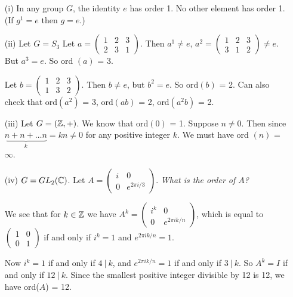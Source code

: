 \documentclass[10pt]{scrartcl}
\begin{document}
\begin{examples}\begin{enumerate}
 \item[(i)] In any group $G$, the identity $e$ has order 1. No other element has order 1. (If $g^1 = e$ then $g = e$.)
 
 \item[(ii)] Let $G = S_3$ Let $a  = \left(\begin{smallmatrix}
1 & 2 & 3 \\ 2 & 3 & 1	
\end{smallmatrix}\right)$. Then $a^1 \neq e$, $a^2 = \left(\begin{smallmatrix}
1 & 2 & 3 \\ 3 & 1 & 2 	
\end{smallmatrix}\right) \neq e$. But $a^3 = e$. So ord $(a)$ = 3.

 Let $b = \left(\begin{smallmatrix}
1 & 2 & 3 \\ 1 & 3 & 2	
\end{smallmatrix}\right).$ Then $b \neq e$, but $b^2 = e$. So ord$(b)$ = 2. Can also check that ord$(a^2)$ = 3, ord$(ab)$ = 2, ord$(a^2b)$ = 2.


\item[(iii)] Let $G = (\mathbb{Z},+)$. We know that ord$(0)$ = 1. Suppose $n \neq 0$. Then since $\underbrace{n + n + \dots n}_{k} = kn \neq 0$ for any positive integer $k$. We must have ord $(n)$ = $\infty$.
\item[(iv)] $G = GL_2(\mathbb{C})$. Let $A = \left(\begin{smallmatrix}
i & 0 \\ 0 & e^{2 \pi i/3} 	
\end{smallmatrix}\right)$. \emph{What is the order of $A$?}

We see that for $k \in \mathbb{Z}$ we have $A^k = \left(\begin{smallmatrix}
i^k & 0 \\ 0 & e^{2\pi ik/n}	
\end{smallmatrix}\right)
$, which is equal to $\left(\begin{smallmatrix}
1 & 0 \\ 0 & 1	
\end{smallmatrix}\right)$ if and only if $i^k = 1$ and $e^{2 \pi ik/n} = 1$.

 Now $i^k = 1$ if and only if $4 ~|~ k$, and $e^{2\pi ik/n} = 1$ if and only if $3 ~|~ k$. So $A^k = I$ if and only if $12 ~|~ k$. Since the smallest positive integer divisible by 12 is 12, we have ord($A$) = 12.
 \end{enumerate}
 \end{examples}
 
\end{document}
